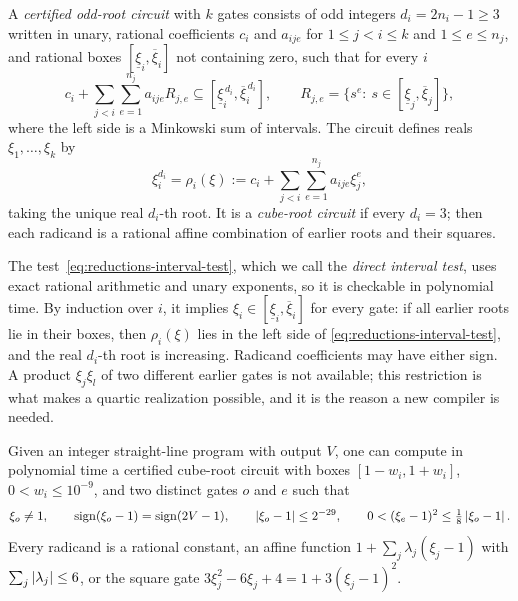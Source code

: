 \begin{definition}
\label{def:reductions-root-circuit}
A \emph{certified odd-root circuit} with $k$ gates consists of odd integers
$d_i=2n_i-1\ge3$ written in unary, rational coefficients $c_i$ and $a_{ije}$
for $1\le j<i\le k$ and $1\le e\le n_j$, and rational boxes
$[\underline\xi_i,\overline\xi_i]$ not containing zero, such that for every
$i$
\begin{equation}
 c_i+\sum_{j<i}\sum_{e=1}^{n_j}a_{ije}R_{j,e}
 \subseteq[\underline\xi_i^{\,d_i},\overline\xi_i^{\,d_i}],
 \qquad
 R_{j,e}=\{s^e:\ s\in[\underline\xi_j,\overline\xi_j]\},
 \label{eq:reductions-interval-test}
\end{equation}
where the left side is a Minkowski sum of intervals. The circuit defines reals
$\xi_1,\ldots,\xi_k$ by
\begin{equation}
 \xi_i^{d_i}=\rho_i(\xi):=c_i+\sum_{j<i}\sum_{e=1}^{n_j}a_{ije}\xi_j^e,
 \label{eq:reductions-root-gate}
\end{equation}
taking the unique real $d_i$-th root. It is a \emph{cube-root circuit} if every
$d_i=3$; then each radicand is a rational affine combination of earlier roots
and their squares.
\end{definition}

The test~\eqref{eq:reductions-interval-test}, which we call the
\emph{direct interval test}, uses exact rational arithmetic and unary
exponents, so it is checkable in polynomial time. By induction over $i$, it
implies $\xi_i\in[\underline\xi_i,\overline\xi_i]$ for every gate: if all
earlier roots lie in their boxes, then $\rho_i(\xi)$ lies in the left side of
\eqref{eq:reductions-interval-test}, and the real $d_i$-th root is increasing.
Radicand coefficients may have either sign. A product $\xi_j\xi_l$ of two
different earlier gates is not available; this restriction is what makes a
quartic realization possible, and it is the reason a new compiler is needed.

\begin{theorem}
\label{thm:reductions-root-circuit}
Given an integer straight-line program with output $V$, one can compute in
polynomial time a certified cube-root circuit with boxes
$[1-w_i,1+w_i]$, $0<w_i\le10^{-9}$, and two distinct gates $o$ and $e$ such
that
\begin{equation}
 \xi_o\ne1,\qquad \operatorname{sign}(\xi_o-1)=\operatorname{sign}(2V-1),
 \qquad\left\lvert\xi_o-1\right\rvert\le2^{-29},
 \qquad 0<(\xi_e-1)^2\le\tfrac18\left\lvert\xi_o-1\right\rvert.
 \label{eq:reductions-compiler-output}
\end{equation}
Every radicand is a rational constant, an affine function
$1+\sum_j\lambda_j(\xi_j-1)$ with $\sum_j\left\lvert\lambda_j\right\rvert\le6$, or the square
gate $3\xi_j^2-6\xi_j+4=1+3(\xi_j-1)^2$.
\end{theorem}

